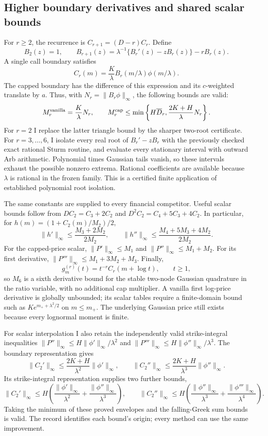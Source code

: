 \subsection{Higher boundary derivatives and shared scalar bounds}
\label{sec:higher-boundary-derivatives}

For $r\geq2$, the recurrence is $C_{r+1}=(D-r)C_r$. Define
\[
 B_2(z)=1,\qquad
 B_{r+1}(z)=\lambda^{-1}\{B_r'(z)-zB_r(z)\}-rB_r(z).
\]
A single call boundary satisfies
\[
 C_r(m)=\frac K\lambda B_r(m/\lambda)\phi(m/\lambda).
\]
The capped boundary has the difference of this expression and its
$c$-weighted translate by $a$. Thus, with
$N_r=\|B_r\phi\|_\infty$, the following bounds are valid:
\[
 M_r^{\rm vanilla}=\frac K\lambda N_r,\qquad
 M_r^{\rm cap}\leq
 \min\left\{H\overline D_r,\frac{2K+H}{\lambda}N_r\right\}.
\]
For $r=2$ I replace the latter triangle bound by the sharper two-root
certificate. For $r=3,\ldots,6$, I isolate every real root of
$B_r'-zB_r$ with the previously checked exact rational Sturm routine,
and evaluate every stationary interval with outward Arb arithmetic.
Polynomial times Gaussian tails vanish, so these intervals exhaust the
possible nonzero extrema. Rational coefficients are available because
$\lambda$ is rational in the frozen family. This is a certified finite
application of established polynomial root isolation.

The same constants are supplied to every financial competitor. Useful
scalar bounds follow from $DC_2=C_3+2C_2$ and
$D^2C_2=C_4+5C_3+4C_2$. In particular, for
$h(m)=(1+C_2(m)/M_2)/2$,
\[
 \|h'\|_\infty\leq\frac{M_3+2M_2}{2M_2},\qquad
 \|h''\|_\infty\leq\frac{M_4+5M_3+4M_2}{2M_2}.
\]
For the capped-price scalar, $\|P'\|_\infty\leq M_1$ and
$\|P''\|_\infty\leq M_1+M_2$. For its first derivative,
$\|P'''\|_\infty\leq M_1+3M_2+M_3$.
Finally,
\[
 g_m^{(r)}(t)=t^{-r}C_r(m+\log t),\qquad t\geq1,
\]
so $M_6$ is a sixth derivative bound for the stable two-node Gaussian
quadrature in the ratio variable, with no additional cap multiplier.
A vanilla first log-price derivative is globally unbounded; its scalar
tables require a finite-domain bound such as
$Ke^{m_++\lambda^2/2}$ on $m\leq m_+$. The underlying Gaussian price
still exists because every lognormal moment is finite.

For scalar interpolation I also retain the independently valid
strike-integral inequalities
$\|P''\|_\infty\leq H\|\phi'\|_\infty/\lambda^2$ and
$\|P'''\|_\infty\leq H\|\phi''\|_\infty/\lambda^3$.
The boundary representation gives
\[
 \|C_2'\|_\infty\leq
 \frac{2K+H}{\lambda^2}\|\phi'\|_\infty,\qquad
 \|C_2''\|_\infty\leq
 \frac{2K+H}{\lambda^3}\|\phi''\|_\infty.
\]
Its strike-integral representation supplies two further bounds,
\[
 \|C_2'\|_\infty\leq
 H\left(\frac{\|\phi'\|_\infty}{\lambda^2}
       +\frac{\|\phi''\|_\infty}{\lambda^3}\right),\qquad
 \|C_2''\|_\infty\leq
 H\left(\frac{\|\phi''\|_\infty}{\lambda^3}
       +\frac{\|\phi'''\|_\infty}{\lambda^4}\right).
\]
Taking the minimum of these proved envelopes and the falling-Greek sum
bounds is valid. The record identifies each bound's origin; every method
can use the same improvement.

